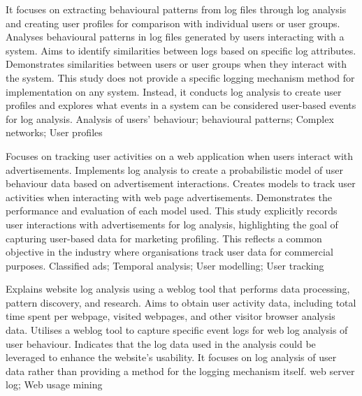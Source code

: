 {
    It focuses on extracting behavioural patterns from log files through log analysis and creating user profiles for comparison with individual users or user groups.
}
{
    Analyses behavioural patterns in log files generated by users interacting with a system. Aims to identify similarities between logs based on specific log attributes.
}
{
    Demonstrates similarities between users or user groups when they interact with the system.
}
{
    This study does not provide a specific logging mechanism method for implementation on any system. Instead, it conducts log analysis to create user profiles and explores what events in a system can be considered user-based events for log analysis.
}
{
    Analysis of users' behaviour; behavioural patterns; Complex networks; User profiles
}

{
    Focuses on tracking user activities on a web application when users interact with advertisements. Implements log analysis to create a probabilistic model of user behaviour data based on advertisement interactions.
}
{
    Creates models to track user activities when interacting with web page advertisements.
}
{
    Demonstrates the performance and evaluation of each model used.
}
{
    This study explicitly records user interactions with advertisements for log analysis, highlighting the goal of capturing user-based data for marketing profiling. This reflects a common objective in the industry where organisations track user data for commercial purposes.
}
{
    Classified ads; Temporal analysis; User modelling; User tracking
}

{
    Explains website log analysis using a weblog tool that performs data processing, pattern discovery, and research. Aims to obtain user activity data, including total time spent per webpage, visited webpages, and other visitor browser analysis data.
}
{
    Utilises a weblog tool to capture specific event logs for web log analysis of user behaviour.
}
{
    Indicates that the log data used in the analysis could be leveraged to enhance the website's usability.
}
{
    It focuses on log analysis of user data rather than providing a method for the logging mechanism itself.
}
{
    web server log; Web usage mining
}